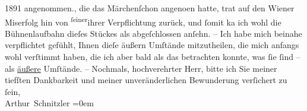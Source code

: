 \begin{ledgroupsized}[t]{13cm}
{{{                            1891 angenommen.}}}\label{K_L00336_3h}, die das Märchenſchon angeno{\geminationm}en hatte, trat
                    auf den Wiener Miserfolg hin von \substVorne{}\textsuperscript{ſeiner}{\allowbreak}\substDazwischen{}ihrer\substHinten{} Verpflichtung zurück, und ſomit ka{\geminationn} ich
                    wohl die Bühnenlaufbahn dieſes Stückes als abgeſchlossen anſehn. – Ich {\pb}habe mich beinahe verpflichtet gefühlt,
                    Ihnen dieſe äußern Umſtände mitzutheilen, die mich anfangs wohl verſtimmt haben,
                    die ich aber bald als das betrachten konnte, was ſie ſind – als \uline{äußere} Umſtände. –\pend
           \pstart
           Nochmals, hochverehrter Herr, bitte ich Sie meiner tiefſten Dankbarkeit und
                    meiner unveränderlichen Bewunderung verſichert zu ſein,{\\[\baselineskip]}\spacefill\mbox{Arthur Schnitzler}\pend
           \leftskip=0em{}
         
         \endnumbering{}\end{ledgroupsized}  \newcommand{\dateiname}{L00336}\newcommand{\titel}{Arthur Schnitzler an Georg Brandes, 12. 6. 1894}\newcommand{\editorInnen}{Martin Anton Müller und Gerd-Hermann Susen}
      